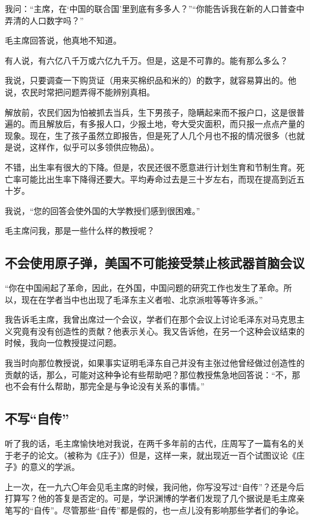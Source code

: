 我问：“主席，在‘中国的联合国’里到底有多多人？”“你能告诉我在新的人口普查中弄清的人口数字吗？”

毛主席回答说，他真地不知道。

有人说，有六亿八千万或六亿九千万。但是，这是不可靠的。能有那么多么？

我说，只要调查一下购货证（用来买棉织品和米的）的数字，就容易算出的。他说，农民时常把问题弄得不能辨别真相。

解放前，农民们因为怕被抓去当兵，生下男孩子，隐瞒起来而不报户口，这是很普遍的。而且解放后，有多报人口，少报土地，夸大受灾面积，而只报一点点产量的现象。现在，生了孩子虽然立即报告，但是死了人几个月也不报的情况很多（也就是说，这样作，似乎可以多领供应物品）。

不错，出生率有很大的下降。但是，农民还很不愿意进行计划生育和节制生育。死亡率可能比出生率下降得还要大。平均寿命过去是三十岁左右，而现在提高到近五十岁。

我说，“您的回答会使外国的大学教授们感到很困难。”

毛主席问我，那是一些什么样的教授呢？

\subsection{不会使用原子弹，美国不可能接受禁止核武器首脑会议}

“你在中国闹起了革命，因此，在外国，中国问题的研究工作也发生了革命。所以，现在在学者当中也出现了毛泽东主义者啦、北京派啦等等许多派。”

我告诉毛主席，我曾出席过一个会议，学者们在那个会议上讨论毛泽东对马克思主义究竟有没有创造性的贡献？他表示关心。我又告诉他，在另一个这种会议结束的时候，我向一位教授提过问题。

我当时向那位教授说，如果事实证明毛泽东自己并没有主张过他曾经做过创造性的贡献的话，那么，可能对这种争论有些帮助吧？那位教授焦急地回答说：“不，那也不会有什么帮助，那完全是与争论没有关系的事情。”

\subsection{不写“自传”}

听了我的话，毛主席愉快地对我说，在两千多年前的古代，庄周写了一篇有名的关于老子的论文。（被称为《庄子》）但是，这样一来，就出现近一百个试图议论《庄子》的意义的学派。

上一次，在一九六〇年会见毛主席的时候，我问他，你写没写过“自传”？还是今后打算写？他的答复是否定的。可是，学识渊博的学者们发现了几个据说是毛主席亲笔写的“自传”。尽管那些“自传”都是假的，也一点儿没有影响那些学者们的争论。


